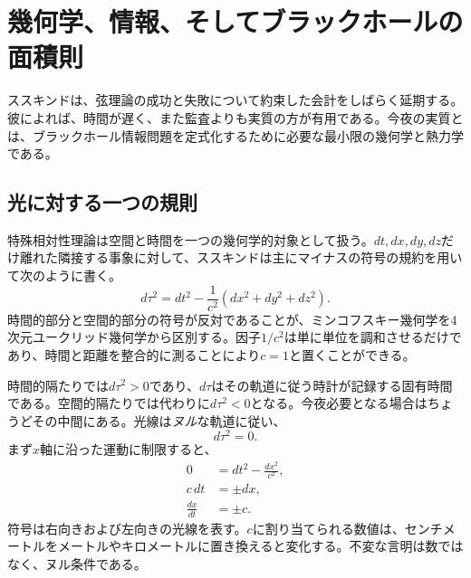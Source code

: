 \chapter{幾何学、情報、そしてブラックホールの面積則}


ススキンドは、弦理論の成功と失敗について約束した会計をしばらく延期する。彼によれば、時間が遅く、また監査よりも実質の方が有用である。今夜の実質とは、ブラックホール情報問題を定式化するために必要な最小限の幾何学と熱力学である。

\section{光に対する一つの規則}

特殊相対性理論は空間と時間を一つの幾何学的対象として扱う。\(dt,dx,dy,dz\)だけ離れた隣接する事象に対して、ススキンドは主にマイナスの符号の規約を用いて次のように書く。
\begin{equation}
d\tau^2=dt^2-\frac{1}{c^2}\left(dx^2+dy^2+dz^2\right).
\end{equation}
時間的部分と空間的部分の符号が反対であることが、ミンコフスキー幾何学を4次元ユークリッド幾何学から区別する。因子\(1/c^2\)は単に単位を調和させるだけであり、時間と距離を整合的に測ることにより\(c=1\)と置くことができる。

時間的隔たりでは\(d\tau^2>0\)であり、\(d\tau\)はその軌道に従う時計が記録する固有時間である。空間的隔たりでは代わりに\(d\tau^2<0\)となる。今夜必要となる場合はちょうどその中間にある。光線は\emph{ヌル}な軌道に従い、
\begin{equation}
d\tau^2=0.
\end{equation}
まず\(x\)軸に沿った運動に制限すると、
\begin{align}
0&=dt^2-\frac{dx^2}{c^2},\\
c\,dt&=\pm dx,\\
\frac{dx}{dt}&=\pm c.
\end{align}
符号は右向きおよび左向きの光線を表す。\(c\)に割り当てられる数値は、センチメートルをメートルやキロメートルに置き換えると変化する。不変な言明は数ではなく、ヌル条件である。

